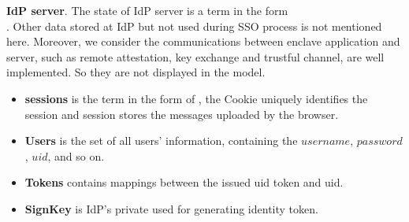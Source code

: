 \noindent\textbf{IdP server}.
The state of IdP server is a term in the form \\ . Other data stored at IdP but not used during SSO process is not mentioned here. Moreover, we consider the communications between enclave application and server, such as remote attestation, key exchange and trustful channel, are well implemented. So they are not displayed in the model.
\vspace{-3mm}
\begin{itemize}
\item \textbf{sessions} is the term in the form of , the Cookie uniquely identifies the session and session stores the messages uploaded by the browser.
\item \textbf{Users} is the set of all users' information, containing the $username$, $password$, $uid$, and so on.
\item \textbf{Tokens} contains mappings between the issued uid token and uid.
\item \textbf{SignKey} is IdP's private used for generating identity token.
\end{itemize}
